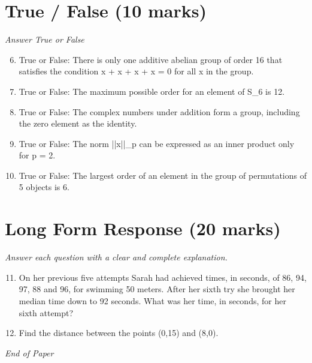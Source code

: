 \documentclass[12pt]{article}
\begin{document}
\section*{True / False (10 marks)}
\textit{Answer True or False}
\begin{enumerate}[label=\arabic*.]
\setcounter{enumi}{5}
\item True or False: There is only one additive abelian group of order 16 that satisfies the condition x + x + x + x = 0 for all x in the group.
\item True or False: The maximum possible order for an element of S\_6 is 12.
\item True or False: The complex numbers under addition form a group, including the zero element as the identity.
\item True or False: The norm ||x||\_p can be expressed as an inner product only for p = 2.
\item True or False: The largest order of an element in the group of permutations of 5 objects is 6.
\end{enumerate}

\section*{Long Form Response (20 marks)}
\textit{Answer each question with a clear and complete explanation.}
\begin{enumerate}[label=\arabic*.]
\setcounter{enumi}{10}
\item On her previous five attempts Sarah had achieved times, in seconds, of 86, 94, 97, 88 and 96, for swimming 50 meters. After her sixth try she brought her median time down to 92 seconds. What was her time, in seconds, for her sixth attempt?
\item Find the distance between the points (0,15) and (8,0).
\end{enumerate}

\vfill
\noindent\textit{End of Paper}
\end{document}
